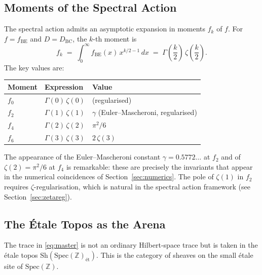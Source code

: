 \documentclass[11pt,a4paper]{article}
\begin{document}
\subsection{Moments of the Spectral Action}
\label{sec:moments}

The spectral action admits an asymptotic expansion in moments $f_k$ of $f$.
For $f = f_{\mathrm{BE}}$ and $D = D_{\mathrm{BC}}$, the $k$-th moment is
\begin{equation}\label{eq:moments}
  f_k \;=\; \int_0^{\infty} f_{\mathrm{BE}}(x)\, x^{k/2 - 1}\, dx
  \;=\; \Gamma\!\left(\frac{k}{2}\right)\, \zeta\!\left(\frac{k}{2}\right).
\end{equation}
The key values are:
\begin{center}
\begin{tabular}{@{}lll@{}}
\toprule
Moment & Expression & Value \\
\midrule
$f_0$ & $\Gamma(0)\,\zeta(0)$ & (regularised) \\
$f_2$ & $\Gamma(1)\,\zeta(1)$ & $\gamma$ (Euler--Mascheroni, regularised) \\
$f_4$ & $\Gamma(2)\,\zeta(2)$ & $\pi^2/6$ \\
$f_6$ & $\Gamma(3)\,\zeta(3)$ & $2\,\zeta(3)$ \\
\bottomrule
\end{tabular}
\end{center}
The appearance of the Euler--Mascheroni constant $\gamma = 0.5772\ldots$ at
$f_2$ and of $\zeta(2) = \pi^2/6$ at $f_4$ is remarkable: these are precisely
the invariants that appear in the numerical coincidences of Section~\ref{sec:numerics}.
The pole of $\zeta(1)$ in $f_2$ requires $\zeta$-regularisation, which is
natural in the spectral action framework (see Section~\ref{sec:zetareg}).

\subsection{The \'Etale Topos as the Arena}
\label{sec:topos}

The trace in \eqref{eq:master} is not an ordinary Hilbert-space trace but is
taken in the \'etale topos $\mathrm{Sh}(\mathrm{Spec}(\mathbb{Z})_{\text{\'et}})$.
This is the category of sheaves on the small \'etale site of
$\mathrm{Spec}(\mathbb{Z})$.
\end{document}
